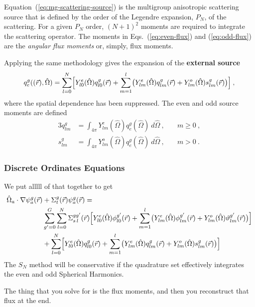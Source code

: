 \documentclass[12pt]{article}
\newcommand{\Macro}{\ensuremath{\Sigma}}
\newcommand{\vecr}{\ensuremath{\vec{r}}}
\newcommand{\vOmega}{\ensuremath{\hat{\Omega}}}
\newcommand{\evenp}{\ensuremath{\phi^{g'}}}
\newcommand{\oddp}{\ensuremath{\vartheta^{g'}}}
\newcommand{\sigg}[1]{\ensuremath{\Macro^{gg'}_{s\,#1}}}
\begin{document}
Equation~(\ref{eq:mg-scattering-source}) is the multigroup anisotropic
scattering source that is defined by the order of the Legendre expansion,
$P_N$, of the scattering.  For a given $P_N$ order, $(N+1)^2$ moments are
required to integrate the scattering operator.  The moments in
Eqs.~(\ref{eq:even-flux}) and (\ref{eq:odd-flux}) are the \textit{angular flux moments} or, simply, flux moments.
  
Applying the same methodology gives the expansion of the \textbf{external source}
\begin{equation}
  q^g_e((\vec{r}), \vOmega) = \sum_{l=0}^{N}\Bigl[
  Y^e_{l0}(\vOmega)q^g_{l0}(\vec{r}) +
  \sum_{m=1}^{l}
  \bigr(
  Y^e_{lm}(\vOmega)q^g_{lm}(\vec{r}) + Y^o_{lm}(\vOmega)s^g_{lm}(\vec{r})\bigr)
  \Bigr]\:,
  \label{eq:mg-external-source}
\end{equation}
where the spatial dependence has been suppressed.  The even and odd source
moments are defined
\begin{alignat}{3}
  q^g_{lm} &= \int_{4\pi}Y^e_{lm}(\vOmega)q^g_e(\vOmega)\:d\vOmega\:,
  \quad&m\ge 0\:,\label{eq:even-source}\\
  s^g_{lm} &= \int_{4\pi}Y^o_{lm}(\vOmega)q^g_e(\vOmega)\:d\vOmega\:,
  \quad&m>0\:.\label{eq:odd-source}
\end{alignat}

\subsubsection*{Discrete Ordinates Equations}
We put alllll of that together to get
\begin{align*}
\vOmega_a \cdot \nabla \psi^g_a(\vecr) &+ \Sigma^g_t(\vecr)\psi^g_a(\vecr) = \\
&\sum_{g'=0}^G
  \sum_{l=0}^N
  \sigg{l}(\vec{r})
  \Bigl[
  Y^e_{l0}(\vOmega)\evenp_{l0}(\vec{r}) +
  \sum_{m=1}^l
  \bigl(
  Y^e_{lm}(\vOmega)\evenp_{lm}(\vec{r}) +
  Y^o_{lm}(\vOmega)\oddp_{lm}(\vec{r})
  \bigr)\Bigr]\\
&+\sum_{l=0}^{N}\Bigl[
  Y^e_{l0}(\vOmega)q^g_{l0}(\vec{r}) +
  \sum_{m=1}^{l}
  \bigr(
  Y^e_{lm}(\vOmega)q^g_{lm}(\vec{r}) + Y^o_{lm}(\vOmega)s^g_{lm}(\vec{r})\bigr)
  \Bigr]
\end{align*}
The $S_N$ method will be conservative if the quadrature set effectively
integrates the even and odd Spherical Harmonics.

The thing that you solve for is the flux moments, and then you reconstruct that flux at the end.
\end{document}
